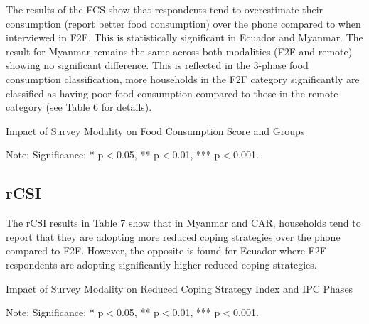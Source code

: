 \documentclass[11pt,harvard]{article}
\begin{document}
	The results of the FCS show that respondents tend to overestimate their consumption (report better food consumption) over the phone compared to when interviewed in F2F. This is statistically significant in Ecuador and Myanmar. The result for Myanmar remains the same across both modalities (F2F and remote) showing no significant difference. This is reflected in the 3-phase food consumption classification, more households in the F2F category significantly are classified as having poor food consumption compared to those in the remote category (see Table 6 for details). 
	
	\begin{table}[htbp]
		\centering
		\begin{adjustbox}{max width=\textwidth}
			\begin{threeparttable}
				\caption{Impact of Survey Modality on Food Consumption Score and Groups}
				\scriptsize
				 
				\label{tab:FCS_Modality_All_Country}
				\begin{tablenotes}
					\item Note: Significance: * p$<$0.05, ** p$<$0.01, *** p$<$0.001. 
				\end{tablenotes}
			\end{threeparttable}
		\end{adjustbox}
	\end{table}
	
	\pagebreak
	
	\subsection{rCSI}
	
	The rCSI results in Table 7 show that in Myanmar and CAR, households tend to report that they are adopting more reduced coping strategies over the phone compared to F2F. However, the opposite is found for Ecuador where F2F respondents are adopting significantly higher reduced coping strategies.
	
	\begin{table}[htbp]
		\centering
		\begin{adjustbox}{max width=\textwidth}
			\begin{threeparttable}
				\caption{Impact of Survey Modality on Reduced Coping Strategy Index and IPC Phases}
				\scriptsize
				 
				\label{tab:rCSI_Modality_All_Country}
				\begin{tablenotes}
					\item Note: Significance: * p$<$0.05, ** p$<$0.01, *** p$<$0.001. 
				\end{tablenotes}
			\end{threeparttable}
		\end{adjustbox}
	\end{table}
	
\end{document}
